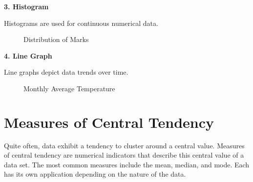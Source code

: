 \documentclass[twoside]{book}
\begin{document}
\textbf{3. Histogram}

Histograms are used for continuous numerical data.

\begin{figure}[H]
\centering
{}
\caption{Distribution of Marks}
\end{figure}

\textbf{4. Line Graph}

Line graphs depict data trends over time.

\begin{figure}[H]
\centering
{}
\caption{Monthly Average Temperature}
\end{figure}

\section{Measures of Central Tendency}

Quite often, data exhibit a tendency to cluster around a central value. Measures of central tendency are numerical indicators that describe this central value of a data set. The most common measures include the mean, median, and mode. Each has its own application depending on the nature of the data.

\end{document}
